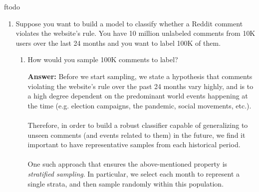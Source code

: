 ƒtodo\documentclass{article}
\newenvironment{QandA}{\begin{enumerate}[label=\arabic*.]}{\end{enumerate}}
\newenvironment{InnerQandA}{\begin{enumerate}[label=\roman*.]}{\end{enumerate}}
\newenvironment{ListAlph}{\begin{enumerate}[label=(\alph*)]}{\end{enumerate}}
\newenvironment{answer}{\par\normalfont \textbf{Answer:}}{}
\newcommand{\g}{\vert}
\begin{document}
\begin{QandA}
\begin{answer}
\begin{ListAlph}
            \item \textit{Negative Sampling.} 
            Negative sampling is a simplified variant of Noise Contrastive Estimation where we neglect to subtract off $\log(Q(y \g x))$ during training. As a result, $F(x, y)$ is trained to approximate $ \log(P(y \g x)) - \log(Q(y \g x))$.\\\\
            It is noteworthy that in Negative Sampling, we are optimizing $F(x, y)$ to approximate something that depends on the sampling distribution $Q$. This will make the results highly dependent on the choice of sampling distribution, which is not true for the previous algorithms. 
            
            (Source: \href{https://www.tensorflow.org/extras/candidate_sampling.pdf}{Tensorflow})
        \end{ListAlph}
    \end{answer}

    \item Suppose you want to build a model to classify whether a Reddit comment violates the website’s rule. You have 10 million unlabeled comments from 10K users over the last 24 months and you want to label 100K of them.
    \begin{InnerQandA}
        \item How would you sample 100K comments to label?
        \begin{answer}
            Before we start sampling, we state a hypothesis that comments violating the website's rule over the past 24 months vary highly, and is to a high degree dependent on the predominant world events happening at the time (e.g. election campaigns, the pandemic, social movements, etc.). \\\\
            Therefore, in order to build a robust classifier capable of generalizing to unseen comments (and events related to them) in the future, we find it important to have representative samples from each historical period. \\\\
            One such approach that ensures the above-mentioned property is \textit{stratified sampling}. In particular, we select each month to represent a single strata, and then sample randomly within this population.
        \end{answer}


\end{InnerQandA}
\end{QandA}
\end{document}

